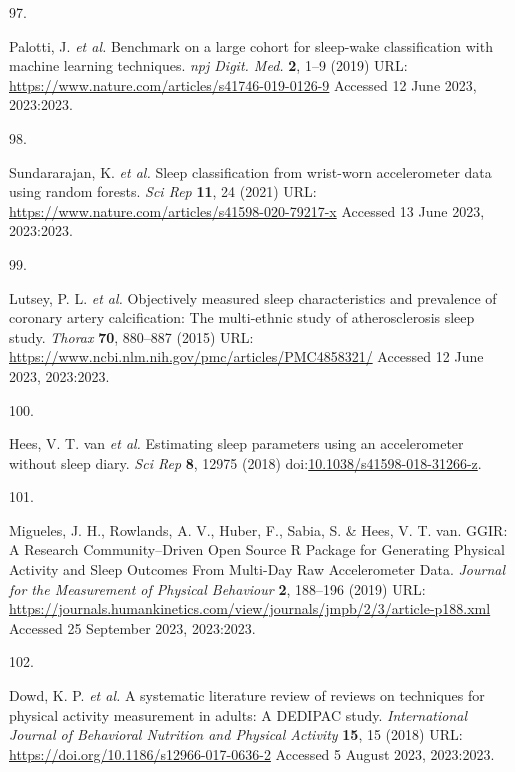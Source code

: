 \documentclass[
  10pt,
]{scrbook}
\newlength{\cslhangindent}
\newlength{\csllabelwidth}
\newlength{\cslentryspacingunit} %
\newenvironment{CSLReferences}[2] %
 {%
  \setlength{\parindent}{0pt}
  \ifodd #1
  \let\oldpar\par
  \def\par{\hangindent=\cslhangindent\oldpar}
  \fi
  \setlength{\parskip}{#2\cslentryspacingunit}
 }%
 {}
\newcommand{\CSLLeftMargin}[1]{\parbox[t]{\csllabelwidth}{#1}}
\newcommand{\CSLRightInline}[1]{\parbox[t]{\linewidth - \csllabelwidth}{#1}\break}
\let\originaltextbf\textbf
\renewcommand{\textbf}[1]{\textcolor{color1}{\originaltextbf{#1}}}
\begin{document}
\begin{CSLReferences}{0}{0}
\leavevmode{}%
\CSLLeftMargin{97. }%
\CSLRightInline{Palotti, J. \emph{et al.} Benchmark on a large cohort
for sleep-wake classification with machine learning techniques.
\emph{npj Digit. Med.} \textbf{2}, 1--9 (2019) URL:
\url{https://www.nature.com/articles/s41746-019-0126-9} Accessed 12 June
2023, 2023:2023.}

\leavevmode{}%
\CSLLeftMargin{98. }%
\CSLRightInline{Sundararajan, K. \emph{et al.} Sleep classification from
wrist-worn accelerometer data using random forests. \emph{Sci Rep}
\textbf{11}, 24 (2021) URL:
\url{https://www.nature.com/articles/s41598-020-79217-x} Accessed 13
June 2023, 2023:2023.}

\leavevmode{}%
\CSLLeftMargin{99. }%
\CSLRightInline{Lutsey, P. L. \emph{et al.} Objectively measured sleep
characteristics and prevalence of coronary artery calcification: The
multi-ethnic study of atherosclerosis sleep study. \emph{Thorax}
\textbf{70}, 880--887 (2015) URL:
\url{https://www.ncbi.nlm.nih.gov/pmc/articles/PMC4858321/} Accessed 12
June 2023, 2023:2023.}

\leavevmode{}%
\CSLLeftMargin{100. }%
\CSLRightInline{Hees, V. T. van \emph{et al.} Estimating sleep
parameters using an accelerometer without sleep diary. \emph{Sci Rep}
\textbf{8}, 12975 (2018)
doi:\href{https://doi.org/10.1038/s41598-018-31266-z}{10.1038/s41598-018-31266-z}.}

\leavevmode{}%
\CSLLeftMargin{101. }%
\CSLRightInline{Migueles, J. H., Rowlands, A. V., Huber, F., Sabia, S.
\& Hees, V. T. van. {GGIR}: {A} {Research} {Community}--{Driven} {Open}
{Source} {R} {Package} for {Generating} {Physical} {Activity} and
{Sleep} {Outcomes} {From} {Multi}-{Day} {Raw} {Accelerometer} {Data}.
\emph{Journal for the Measurement of Physical Behaviour} \textbf{2},
188--196 (2019) URL:
\url{https://journals.humankinetics.com/view/journals/jmpb/2/3/article-p188.xml}
Accessed 25 September 2023, 2023:2023.}

\leavevmode{}%
\CSLLeftMargin{102. }%
\CSLRightInline{Dowd, K. P. \emph{et al.} A systematic literature review
of reviews on techniques for physical activity measurement in adults: A
{DEDIPAC} study. \emph{International Journal of Behavioral Nutrition and
Physical Activity} \textbf{15}, 15 (2018) URL:
\url{https://doi.org/10.1186/s12966-017-0636-2} Accessed 5 August 2023,
2023:2023.}


\end{CSLReferences}
\end{document}
